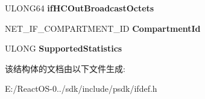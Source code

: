 \begin{DoxyCompactItemize}
U\+L\+O\+N\+G64 {\bfseries if\+H\+C\+Out\+Broadcast\+Octets}
\item 
\mbox{\label{struct___n_d_i_s___i_n_t_e_r_f_a_c_e___i_n_f_o_r_m_a_t_i_o_n_a2956c247462545944f4250398e3abf2a}} 
N\+E\+T\+\_\+\+I\+F\+\_\+\+C\+O\+M\+P\+A\+R\+T\+M\+E\+N\+T\+\_\+\+ID {\bfseries Compartment\+Id}
\item 
\mbox{\label{struct___n_d_i_s___i_n_t_e_r_f_a_c_e___i_n_f_o_r_m_a_t_i_o_n_a8412e7982366139f02d60c3d192bf325}} 
U\+L\+O\+NG {\bfseries Supported\+Statistics}
\end{DoxyCompactItemize}


该结构体的文档由以下文件生成\+:\begin{DoxyCompactItemize}
\item 
E\+:/\+React\+O\+S-\/0../sdk/include/psdk/ifdef.\+h\end{DoxyCompactItemize}

